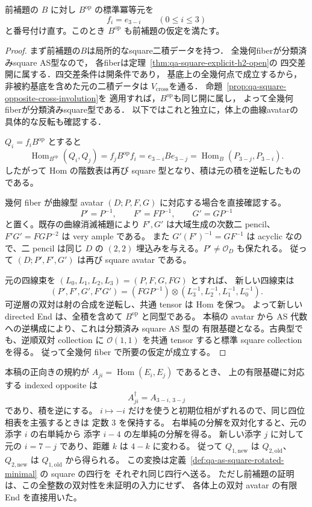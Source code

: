 \begin{lemma}[square有限基礎の反対代数]
\label{lem:qa-square-foundation-opposite}
前補題の $B$ に対し $B^{\mathrm{op}}$ の標準冪等元を
\[
 f_i=e_{3-i}\qquad(0\leq i\leq3)
\]
と番号付け直す。このとき $B^{\mathrm{op}}$ も前補題の仮定を満たす。
\end{lemma}
\begin{proof}
まず前補題の$B$は局所的なsquare二積データを持つ．
全幾何fiberが分類済みsquare AS型なので，
各fiberは定理~\ref{thm:qa-square-explicit-h2-open}の
四交差開に属する．四交差条件は開条件であり，
基底上の全幾何点で成立するから，
非被約基底を含めた元の二積データは
$V_{\mathrm{cross}}$を通る．
命題~\ref{prop:qa-square-opposite-cross-involution}を
適用すれば，$B^{\mathrm{op}}$も同じ開に属し，
よって全幾何fiberが分類済みsquare型である．
以下ではこれと独立に，体上の曲線avatarの
具体的な反転も確認する．

$Q_i=f_iB^{\mathrm{op}}$ とすると
\[
 \operatorname{Hom}_{B^{\mathrm{op}}}(Q_i,Q_j)
 =f_jB^{\mathrm{op}}f_i
 =e_{3-i}Be_{3-j}
 =\operatorname{Hom}_B(P_{3-j},P_{3-i}).
\]
したがって Hom の階数表は再び square 型となり、積は元の積を逆転したものである。

幾何 fiber が曲線型 avatar $(D;P,F,G)$ に対応する場合を直接確認する。
\[
 P'=P^{-1},\qquad F'=FP^{-1},\qquad G'=GP^{-1}
\]
と置く。既存の曲線消滅補題により $F',G'$ は大域生成の次数二 pencil、
$F'G'=FGP^{-2}$ は very ample である。
また $G'(F')^{-1}=GF^{-1}$ は acyclic なので、二 pencil は同じ $D$ の
$(2,2)$ 埋込みを与える。$P'\ne\mathcal O_D$ も保たれる。
従って $(D;P',F',G')$ は再び square avatar である。

元の四線束を $(L_0,L_1,L_2,L_3)=(P,F,G,FG)$ とすれば、
新しい四線束は
\[
 (P',F',G',F'G')
 =(FGP^{-1})\otimes
 (L_3^{-1},L_2^{-1},L_1^{-1},L_0^{-1}).
\]
可逆層の双対は射の合成を逆転し、共通 tensor は Hom を保つ。
よって新しい directed End は、全積を含めて $B^{\mathrm{op}}$ と同型である。
本稿の avatar から AS 代数への逆構成により、これは分類済み square AS 型の
有限基礎となる。古典型でも、逆順双対 collection に
$\mathcal O(1,1)$ を共通 tensor すると標準 square collection を得る。
従って全幾何 fiber で所要の仮定が成立する。
\end{proof}

\begin{remark}[全整数AS代数で書く場合の反転]
本稿の正向きの規約が $A_{ji}=\operatorname{Hom}(E_i,E_j)$ であるとき、
上の有限基礎に対応する indexed opposite は
\[
 A^{\dagger}_{ji}=A_{3-i,\,3-j}
\]
であり、積を逆にする。
$i\mapsto-i$ だけを使うと初期位相がずれるので、同じ四位相表を主張するときは
定数 $3$ を保持する。
右単純の分解を双対化すると、元の添字 $i$ の右単純から
添字 $i-4$ の左単純の分解を得る。
新しい添字 $j$ に対して元の $i=7-j$ であり、距離 $k$ は $4-k$ に変わる。
従って $Q_{1,\mathrm{new}}$ は $Q_{2,\mathrm{old}}$、$Q_{2,\mathrm{new}}$ は
$Q_{1,\mathrm{old}}$ から得られる。
この変換は定義~\ref{def:qa-as-square-rotated-minimal} の square の四行を
それぞれ同じ四行へ送る。
ただし前補題の証明は、この全整数の双対性を未証明の入力にせず、
各体上の双対 avatar の有限 End を直接用いた。
\end{remark}

